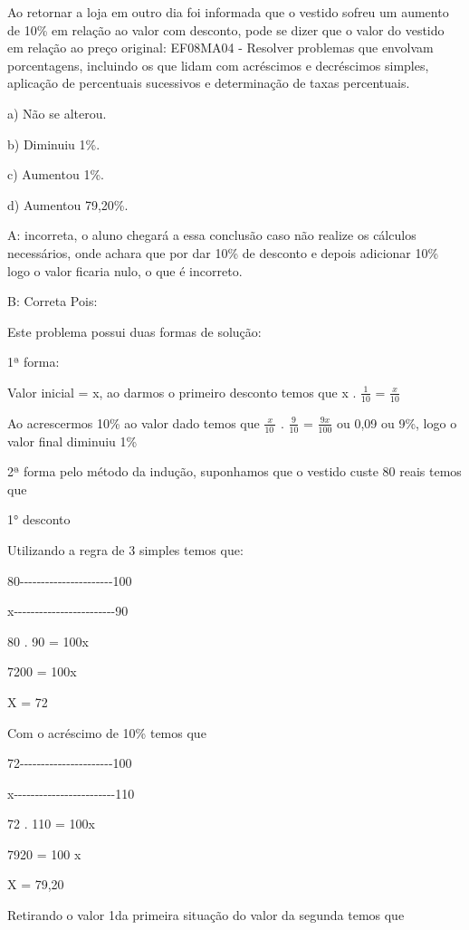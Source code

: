 Ao retornar a loja em outro dia foi informada que o vestido sofreu um
aumento de 10\% em relação ao valor com desconto, pode se dizer que o
valor do vestido em relação ao preço original: EF08MA04 - Resolver
problemas que envolvam porcentagens, incluindo os que lidam com
acréscimos e decréscimos simples, aplicação de percentuais sucessivos e
determinação de taxas percentuais.

a) Não se alterou.

b) Diminuiu 1\%.

c) Aumentou 1\%.

d) Aumentou 79,20\%.

A: incorreta, o aluno chegará a essa conclusão caso não realize os
cálculos necessários, onde achara que por dar 10\% de desconto e depois
adicionar 10\% logo o valor ficaria nulo, o que é incorreto.

B: Correta Pois:

Este problema possui duas formas de solução:

1ª forma:

Valor inicial = x, ao darmos o primeiro desconto temos que x .
\(\frac{1}{10}\) = \(\frac{x}{10}\)

Ao acrescermos 10\% ao valor dado temos que \(\frac{x}{10\ }\) .
\(\frac{9}{10}\) = \(\frac{9x}{100}\) ou 0,09 ou 9\%, logo o valor final
diminuiu 1\%

2ª forma pelo método da indução, suponhamos que o vestido custe 80 reais
temos que

1° desconto

Utilizando a regra de 3 simples temos que:

80-\/-\/-\/-\/-\/-\/-\/-\/-\/-\/-\/-\/-\/-\/-\/-\/-\/-\/-\/-\/-\/-100

x-\/-\/-\/-\/-\/-\/-\/-\/-\/-\/-\/-\/-\/-\/-\/-\/-\/-\/-\/-\/-\/-\/-\/-90

80 . 90 = 100x

7200 = 100x

X = 72

Com o acréscimo de 10\% temos que

72-\/-\/-\/-\/-\/-\/-\/-\/-\/-\/-\/-\/-\/-\/-\/-\/-\/-\/-\/-\/-\/-100

x-\/-\/-\/-\/-\/-\/-\/-\/-\/-\/-\/-\/-\/-\/-\/-\/-\/-\/-\/-\/-\/-\/-\/-110

72 . 110 = 100x

7920 = 100 x

X = 79,20

Retirando o valor 1da primeira situação do valor da segunda temos que

